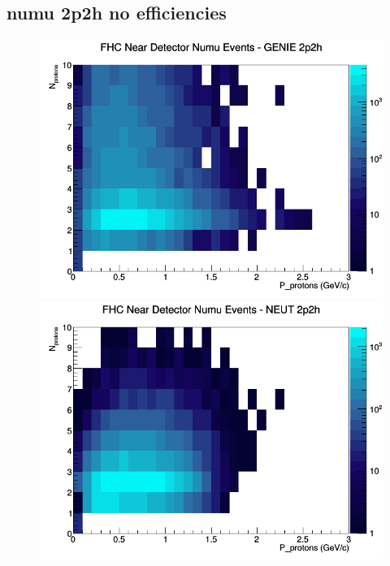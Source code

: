 \documentclass[12pt]{article}
\begin{document}
\subsection{numu 2p2h no efficiencies}
\begin{figure}[h]
\includegraphics[width=\linewidth]{N_P/nominal/protons/2p2h_FHC_ND_numu_N_P_GENIE.png}
\endminipage
{}
\includegraphics[width=\linewidth]{N_P/nominal/protons/2p2h_FHC_ND_numu_N_P_NEUT.png}
\endminipage
{}

\end{figure}
\end{document}
